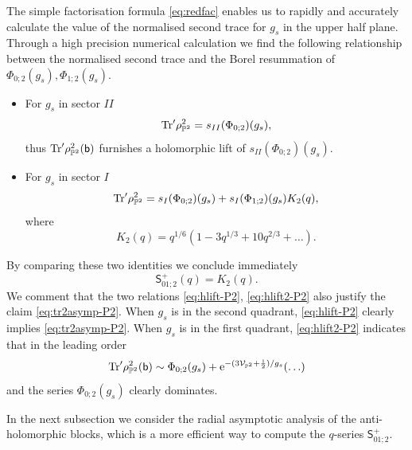 \documentclass[a4paper,11pt]{article}
\theoremstyle{definition}
\newcommand{\CV}{{\cal V}}
\def\IP{{\mathbb P}}
\newcommand{\tr}{{\rm Tr}}
\newcommand{\re}{{\rm e}}
\newcommand{\ri}{{\rm i}}
\newcommand{\bb}{\mathsf{b}}
\def\ms{\mathsf}
\begin{document}
The simple factorisation formula \eqref{eq:redfac} enables us to
rapidly and accurately calculate the value of the normalised second
trace for $g_s$ in the upper half plane. Through a high precision
numerical calculation we find the following relationship between the
normalised second trace and the Borel resummation of
$\Phi_{0;2}(g_s), \Phi_{1;2}(g_s)$.
\begin{itemize}
\item For $g_s$ in sector $II$
  \begin{equation}
    \tr'\rho_{\IP^2}^2 = s_{II}(\Phi_{0;2})(g_s),
    \label{eq:hlift-P2}
  \end{equation}
  thus $\tr'\rho_{\IP^2}^2(\bb)$ furnishes a holomorphic lift of
  $s_{II}(\Phi_{0;2})(g_s)$.
\item For $g_s$ in sector $I$
  \begin{equation}
    \tr'\rho_{\IP^2}^2 = s_{I}(\Phi_{0;2})(g_s) +
    s_{I}(\Phi_{1;2})(g_s) K_2(q),
    \label{eq:hlift2-P2}
  \end{equation}
  where
  \begin{equation}
    K_2(q) = q^{1/6}(1-3q^{1/3}+10q^{2/3} + \ldots).
  \end{equation}
\end{itemize}
By comparing these two identities we conclude immediately
\begin{equation}
  \ms{S}^+_{01;2}(q) =K_2(q).
\end{equation}
We comment that the two relations
\eqref{eq:hlift-P2}, \eqref{eq:hlift2-P2} also justify the claim
\eqref{eq:tr2asymp-P2}.
When $g_s$ is in the second quadrant, \eqref{eq:hlift-P2} clearly
implies \eqref{eq:tr2asymp-P2}.
When $g_s$ is in the first quadrant, \eqref{eq:hlift2-P2} indicates
that in the leading order
\begin{equation}
  \tr'\rho_{\IP^2}^2(\bb) \sim \Phi_{0;2}(g_s) +
  \re^{-(3\CV_{\IP^2}+\frac{\ri}{2})/g_s} (\ldots)
\end{equation}
and the series $\Phi_{0;2}(g_s)$ clearly dominates.

In the next subsection we consider the radial asymptotic analysis of
the anti-holomorphic blocks, which is a more efficient way to compute
the $q$-series $\ms{S}_{01;2}^+$.

\end{document}

